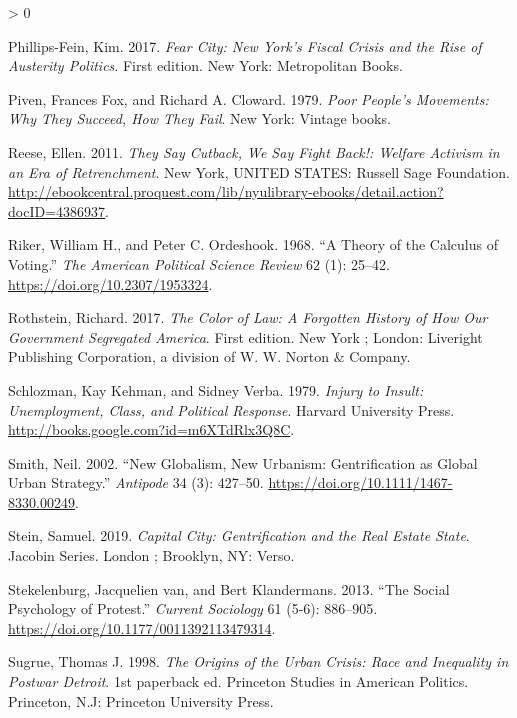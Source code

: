 \documentclass[
  12pt,
]{article}
\newlength{\cslhangindent}
\newenvironment{CSLReferences}[2] %
 {%
  \setlength{\parindent}{0pt}
  \ifodd #1 \everypar{\setlength{\hangindent}{\cslhangindent}}\ignorespaces\fi
  \ifnum #2 > 0
  \setlength{\parskip}{#2\baselineskip}
  \fi
 }%
 {}
\begin{document}
\begin{CSLReferences}{1}{0}
\leavevmode\hypertarget{ref-Phillips-Fein2017}{}%
Phillips-Fein, Kim. 2017. \emph{Fear City: {New York}'s Fiscal Crisis and the Rise of Austerity Politics}. First edition. {New York}: {Metropolitan Books}.

\leavevmode\hypertarget{ref-Piven1979}{}%
Piven, Frances Fox, and Richard A. Cloward. 1979. \emph{Poor People's Movements: Why They Succeed, How They Fail}. {New York}: {Vintage books}.

\leavevmode\hypertarget{ref-Reese2011}{}%
Reese, Ellen. 2011. \emph{They {Say Cutback}, {We Say Fight Back}!: {Welfare Activism} in an {Era} of {Retrenchment}}. {New York, UNITED STATES}: {Russell Sage Foundation}. \url{http://ebookcentral.proquest.com/lib/nyulibrary-ebooks/detail.action?docID=4386937}.

\leavevmode\hypertarget{ref-Riker1968}{}%
Riker, William H., and Peter C. Ordeshook. 1968. {``A {Theory} of the {Calculus} of {Voting}.''} \emph{The American Political Science Review} 62 (1): 25--42. \url{https://doi.org/10.2307/1953324}.

\leavevmode\hypertarget{ref-Rothstein2017}{}%
Rothstein, Richard. 2017. \emph{The Color of Law: A Forgotten History of How Our Government Segregated {America}}. First edition. {New York ; London}: {Liveright Publishing Corporation, a division of W. W. Norton \& Company}.

\leavevmode\hypertarget{ref-Schlozman1979}{}%
Schlozman, Kay Kehman, and Sidney Verba. 1979. \emph{Injury to {Insult}: {Unemployment}, {Class}, and {Political Response}}. {Harvard University Press}. \url{http://books.google.com?id=m6XTdRlx3Q8C}.

\leavevmode\hypertarget{ref-Smith2002}{}%
Smith, Neil. 2002. {``New {Globalism}, {New Urbanism}: {Gentrification} as {Global Urban Strategy}.''} \emph{Antipode} 34 (3): 427--50. \url{https://doi.org/10.1111/1467-8330.00249}.

\leavevmode\hypertarget{ref-Stein2019}{}%
Stein, Samuel. 2019. \emph{Capital City: Gentrification and the Real Estate State}. Jacobin Series. {London ; Brooklyn, NY}: {Verso}.

\leavevmode\hypertarget{ref-vanStekelenburg2013}{}%
Stekelenburg, Jacquelien van, and Bert Klandermans. 2013. {``The Social Psychology of Protest.''} \emph{Current Sociology} 61 (5-6): 886--905. \url{https://doi.org/10.1177/0011392113479314}.

\leavevmode\hypertarget{ref-Sugrue1998}{}%
Sugrue, Thomas J. 1998. \emph{The Origins of the Urban Crisis: Race and Inequality in Postwar {Detroit}}. 1st paperback ed. Princeton Studies in {American} Politics. {Princeton, N.J}: {Princeton University Press}.


\end{CSLReferences}
\end{document}
